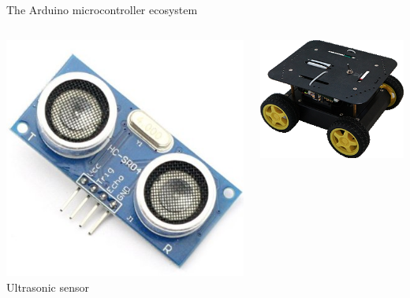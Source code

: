 \documentclass[compress]{beamer}
\begin{document}
\begin{frame}{The Arduino microcontroller ecosystem}
    \begin{columns}
        \begin{column}{0.25\linewidth}
            \begin{center}
                \includegraphics[width=0.9\linewidth]{us-sensor}
                Ultrasonic sensor
            \end{center}
        \end{column}
        \begin{column}{0.25\linewidth}
            \begin{center}
                \includegraphics[width=0.9\linewidth]{robot-car}

\end{center}
\end{column}
\end{columns}
\end{frame}
\end{document}
